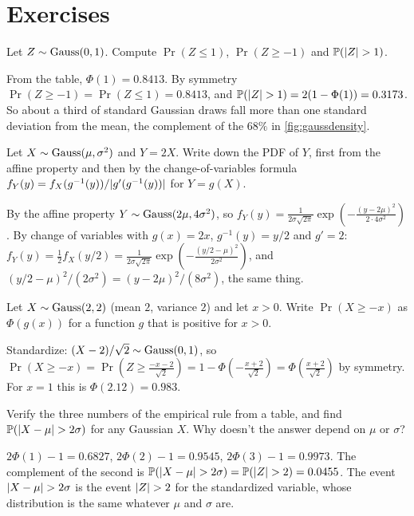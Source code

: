 \section{Exercises}
\label{sec:gauss-exercises}

\begin{exercise}
Let $Z \sim \text{Gauss}(0,1)$. Compute $\Pr(Z \leq 1)$, $\Pr(Z \geq -1)$ and $\mathbb{P}(\lvert Z\rvert > 1)$.
\end{exercise}
\begin{solution}
From the table, $\Phi(1) = 0.8413$. By symmetry $\Pr(Z \geq -1) = \Pr(Z \leq 1) = 0.8413$, and $\mathbb{P}(\lvert Z\rvert > 1) = 2(1 - \Phi(1)) = 0.3173$. So about a third of standard Gaussian draws fall more than one standard deviation from the mean, the complement of the $68\%$ in \cref{fig:gaussdensity}.
\end{solution}

\begin{exercise}
Let $X \sim \text{Gauss}(\mu, \sigma^2)$ and $Y = 2X$. Write down the PDF of $Y$, first from the affine property and then by the change-of-variables formula $f_Y(y) = f_X(g^{-1}(y)) / \lvert g'(g^{-1}(y))\rvert$ for $Y = g(X)$.
\end{exercise}
\begin{solution}
By the affine property $Y \sim \text{Gauss}(2\mu, 4\sigma^2)$, so $f_Y(y) = \frac{1}{2\sigma\sqrt{2\pi}} \exp \left( -\frac{(y - 2\mu)^2}{2 \cdot 4\sigma^2} \right)$. By change of variables with $g(x) = 2x$, $g^{-1}(y) = y/2$ and $g' = 2$: $f_Y(y) = \frac{1}{2} f_X(y/2) = \frac{1}{2\sigma\sqrt{2\pi}} \exp \left( -\frac{(y/2 - \mu)^2}{2\sigma^2} \right)$, and $(y/2 - \mu)^2 / (2\sigma^2) = (y - 2\mu)^2 / (8\sigma^2)$, the same thing.
\end{solution}

\begin{exercise}
Let $X \sim \text{Gauss}(2, 2)$ (mean $2$, variance $2$) and let $x > 0$. Write $\Pr(X \geq -x)$ as $\Phi(g(x))$ for a function $g$ that is positive for $x > 0$.
\end{exercise}
\begin{solution}
Standardize: $(X - 2)/\sqrt{2} \sim \text{Gauss}(0,1)$, so $\Pr(X \geq -x) = \Pr \left( Z \geq \frac{-x - 2}{\sqrt{2}} \right) = 1 - \Phi \left( -\frac{x+2}{\sqrt{2}} \right) = \Phi \left( \frac{x + 2}{\sqrt{2}} \right)$ by symmetry. For $x = 1$ this is $\Phi(2.12) = 0.983$.
\end{solution}

\begin{exercise}
Verify the three numbers of the empirical rule from a table, and find $\mathbb{P}(\lvert X - \mu\rvert > 2\sigma)$ for any Gaussian $X$. Why doesn't the answer depend on $\mu$ or $\sigma$?
\end{exercise}
\begin{solution}
$2\Phi(1) - 1 = 0.6827$, $2\Phi(2) - 1 = 0.9545$, $2\Phi(3) - 1 = 0.9973$. The complement of the second is $\mathbb{P}(\lvert X - \mu\rvert > 2\sigma) = \mathbb{P}(\lvert Z\rvert > 2) = 0.0455$. The event $\lvert X - \mu\rvert > 2\sigma$ is the event $\lvert Z\rvert > 2$ for the standardized variable, whose distribution is the same whatever $\mu$ and $\sigma$ are.
\end{solution}

